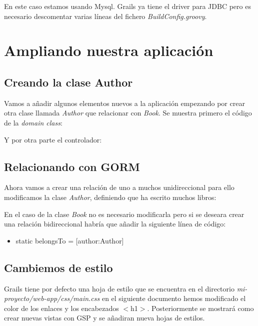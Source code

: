 \documentclass[a4paper,12pt,spanish]{article}
\begin{document}


En este caso estamos usando Mysql. Grails ya tiene el driver para JDBC pero es necesario descomentar varias líneas del fichero {\it BuildConfig.groovy}.



\section{Ampliando nuestra aplicación}
\subsection{Creando la clase Author}

Vamos a añadir algunos elementos nuevos a la aplicación empezando por crear otra clase llamada {\it Author} que relacionar con {\it Book}. Se muestra primero el código de la {\it domain class}:



Y por otra parte el controlador:



\subsection{Relacionando con GORM}

Ahora vamos a crear una relación de uno a muchos unidireccional para ello modificamos la clase {\it Author}, definiendo que ha escrito muchos libros:



En el caso de la clase {\it Book} no es necesario modificarla pero si se deseara crear una relación bidireccional habría que añadir la siguiente línea de código:

\begin{itemize}
\item static belongsTo = [author:Author]
\end{itemize}

%



\subsection{Cambiemos de estilo}

Grails tiene por defecto una hoja de estilo que se encuentra en el directorio {\it mi-proyecto/web-app/css/main.css} en el siguiente documento hemos modificado el color de los enlaces y los encabezados $<$h1$>$. Posteriormente se mostrará como crear nuevas vistas con GSP y se añadiran nueva hojas de estilos.

 
\end{document}
